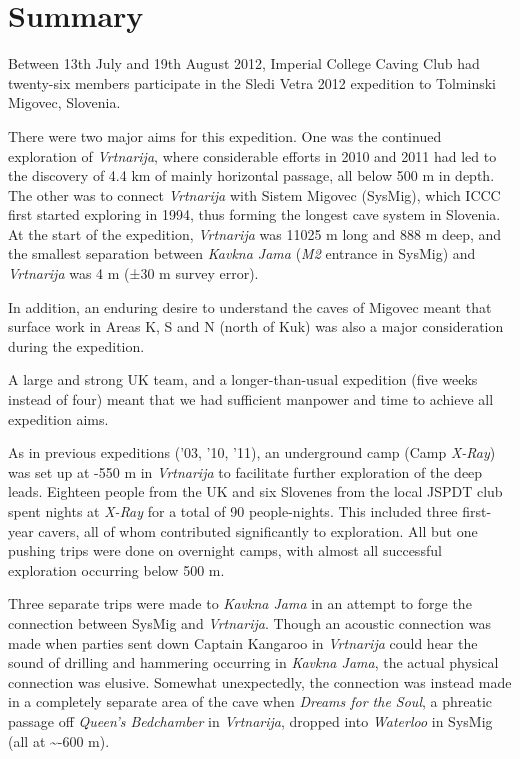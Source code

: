 \section{Summary}

Between 13th July and 19th August 2012, Imperial College Caving Club had
twenty-six members participate in the Sledi Vetra
 2012 expedition to Tolminski Migovec,
Slovenia.

There were two major aims for this expedition. One was the continued
exploration of \emph{Vrtnarija}, where considerable efforts in 2010 and
2011 had led to the discovery of 4.4 km of mainly horizontal passage,
all below 500 m in depth. The other was to connect \emph{Vrtnarija} with
Sistem Migovec (SysMig), which ICCC first started exploring in 1994,
thus forming the longest cave system in Slovenia. At the start of the
expedition, \emph{Vrtnarija} was 11025 m long and 888 m deep, and the
smallest separation between \emph{Kavkna Jama} (\emph{M2} entrance in
SysMig) and \emph{Vrtnarija} was 4 m (±30 m survey error).

In addition, an enduring desire to understand the caves of Migovec meant
that surface work in Areas K, S and N (north of Kuk) was also a major
consideration during the expedition.

A large and strong UK team, and a longer-than-usual expedition (five
weeks instead of four) meant that we had sufficient manpower and time to
achieve all expedition aims.

As in previous expeditions ('03, '10, '11), an underground camp (Camp
\emph{X-Ray}) was set up at -550 m in \emph{Vrtnarija} to facilitate
further exploration of the deep leads. Eighteen people from the UK and
six Slovenes from the local JSPDT club spent nights at \emph{X-Ray} for
a total of 90 people-nights. This included three first-year cavers, all
of whom contributed significantly to exploration. All but one pushing
trips were done on overnight camps, with almost all successful
exploration occurring below 500 m.

Three separate trips were made to \emph{Kavkna Jama} in an attempt to
forge the connection between SysMig and \emph{Vrtnarija}. Though an
acoustic connection was made when parties sent down Captain Kangaroo in
\emph{Vrtnarija} could hear the sound of drilling and hammering
occurring in \emph{Kavkna Jama}, the actual physical connection was
elusive. Somewhat unexpectedly, the connection was instead made in a
completely separate area of the cave when \emph{Dreams for the Soul}, a
phreatic passage off \emph{Queen's Bedchamber} in \emph{Vrtnarija},
dropped into \emph{Waterloo} in SysMig (all at \textasciitilde -600 m).

